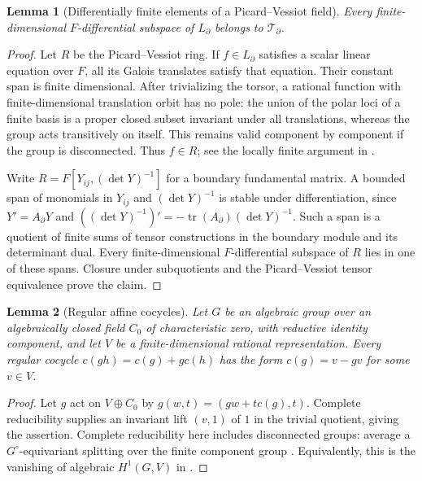 \documentclass[11pt]{article}
\numberwithin{equation}{section}
\newtheorem{lemma}[lemma]{Lemma}
\theoremstyle{definition}
\theoremstyle{remark}
\newcommand{\Tcal}{\mathcal T}
\begin{document}
\begin{lemma}[Differentially finite elements of a Picard--Vessiot field]
\label{lem:dfinite}
Every finite-dimensional $F$-differential subspace of $L_\partial$ belongs
to $\Tcal_\partial$.
\end{lemma}
\begin{proof}
Let $R$ be the Picard--Vessiot ring. If $f\in L_\partial$ satisfies a scalar
linear equation over $F$, all its Galois translates satisfy that equation.
Their constant span is finite dimensional. After trivializing the torsor,
a rational function with finite-dimensional translation orbit has no pole:
the union of the polar loci of a finite basis is a proper closed subset
invariant under all translations, whereas the group acts transitively on
itself. This remains valid component by component if the group is
 disconnected. Thus $f\in R$; see the locally finite argument in
\cite[proof of Proposition 1.3.33]{Singer}.

Write $R=F[Y_{ij},(\det Y)^{-1}]$ for a boundary fundamental matrix.
A bounded span of monomials in $Y_{ij}$ and $(\det Y)^{-1}$ is stable
under differentiation, since $Y'=A_\partial Y$ and
$((\det Y)^{-1})'=-\operatorname{tr}(A_\partial)(\det Y)^{-1}$.
Such a span is a quotient of finite sums of tensor constructions in the
boundary module and its determinant dual. Every finite-dimensional
$F$-differential subspace of $R$ lies in one of these spans. Closure under
subquotients and the Picard--Vessiot tensor equivalence
\cite[Theorem 1.5.2]{Singer} prove the claim.
\end{proof}

\begin{lemma}[Regular affine cocycles]\label{lem:affine-cocycle}
Let $G$ be an algebraic group over an algebraically closed field $C_0$
of characteristic zero, with reductive identity component, and let $V$
be a finite-dimensional rational representation. Every regular cocycle
$c(gh)=c(g)+g c(h)$ has the form $c(g)=v-gv$ for some $v\in V$.
\end{lemma}
\begin{proof}
Let $g$ act on $V\oplus C_0$ by
$g(w,t)=(gw+t c(g),t)$. Complete reducibility supplies an invariant
lift $(v,1)$ of $1$ in the trivial quotient, giving the assertion.
Complete reducibility here includes disconnected groups: average a
$G^\circ$-equivariant splitting over the finite component group
\cite[Corollary~22.43]{MilneAG}. Equivalently, this is the vanishing of
algebraic $H^1(G,V)$ in \cite[Proposition~15.15]{MilneAG}.
\end{proof}
\end{document}
